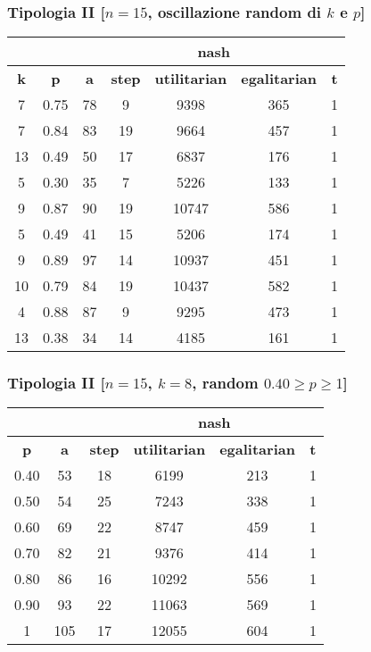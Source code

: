 \documentclass{beamer}
\begin{document}
\begin{frame}
\frametitle{Tipologia II [$n=15$, oscillazione random di $k$ e $p$]}
\begin{table}[H]
\centering
\scalebox{1} {
\begin{tabular}{|c|c|c|c|c|c|c|}
\hline
\multicolumn{3}{|c|}{\textbf{}} & \multicolumn{3}{c|}{\textbf{\color{orange}nash}} & \textbf{} \\ \hline
\textbf{\alert{k}} & \textbf{\alert{p}} & \textbf{a} & \textbf{step} & \textbf{utilitarian} & \textbf{egalitarian} & \textbf{t} \\ \hline
7 & 0.75 & 78 & 9 & 9398 & 365 & 1 \\ \hline
7 & 0.84 & 83 & 19 & 9664 & 457 & 1 \\ \hline
13 & 0.49 & 50 & 17 & 6837 & 176 & 1 \\ \hline
5 & 0.30 & 35 & 7 & 5226 & 133 & 1 \\ \hline
9 & 0.87 & 90 & 19 & 10747 & 586 & 1 \\ \hline
5 & 0.49 & 41 & 15 & 5206 & 174 & 1 \\ \hline
9 & 0.89 & 97 & 14 & 10937 & 451 & 1 \\ \hline
10 & 0.79 & 84 & 19 & 10437 & 582 & 1 \\ \hline
4 & 0.88 & 87 & 9 & 9295 & 473 & 1 \\ \hline
13 & 0.38 & 34 & 14 & 4185 & 161 & 1 \\ \hline
\end{tabular}
}
\end{table}
\end{frame}


\begin{frame}
\frametitle{Tipologia II [$n=15$, $k=8$, random $0.40 \geq p \geq 1$]}
\begin{table}[H]
\centering
\scalebox{1} {
\begin{tabular}{|c|c|c|c|c|c|}
\hline
\multicolumn{3}{|c|}{\textbf{}} & \multicolumn{2}{c|}{\textbf{\color{orange}nash}} & \textbf{} \\ \hline
\textbf{\alert{p}} & \textbf{a} & \textbf{step} & \textbf{utilitarian} & \textbf{egalitarian} & \textbf{t} \\ \hline
0.40 & 53 & 18 & 6199 & 213 & 1 \\ \hline
0.50 & 54 & 25 & 7243 & 338 & 1 \\ \hline
0.60 & 69 & 22 & 8747 & 459 & 1 \\ \hline
0.70 & 82 & 21 & 9376 & 414 & 1 \\ \hline
0.80 & 86 & 16 & 10292 & 556 & 1 \\ \hline
0.90 & 93 & 22 & 11063 & 569 & 1 \\ \hline
1 & 105 & 17 & 12055 & 604 & 1 \\ \hline
\end{tabular}
}
\end{table}
\end{frame}
\end{document}
